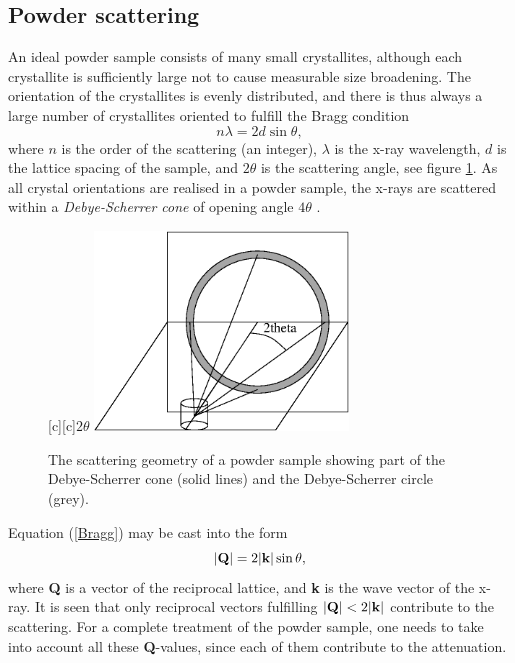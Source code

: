 \subsection{Powder scattering}
An ideal powder sample consists of many small
crystallites, although each crystallite is sufficiently
large not to cause measurable size broadening.
The orientation of the crystallites is evenly distributed,
and there is thus always a large number of
crystallites oriented to fulfill the Bragg condition
\begin{equation}   \label{Bragg}
n \lambda = 2 d \sin \theta ,
\end{equation}
where $n$ is the order of the scattering (an integer), $\lambda$
is the x-ray wavelength, $d$ is the lattice spacing of the sample,
and $2 \theta$ is the scattering angle, see figure \ref{coneFig}.
As all crystal orientations
are realised in a powder sample, the x-rays are scattered within a
{\em Debye-Scherrer cone} of opening angle $4 \theta$ \cite{bacon}.

\begin{figure}
  \begin{center}
    [c][c]{$2\theta$}
    \includegraphics[width=0.6\textwidth]{figures/powder.eps}
  \end{center}
\caption{The scattering geometry of a powder sample showing part of the
Debye-Scherrer cone (solid lines) and the Debye-Scherrer circle (grey).}
\label{coneFig}
\end{figure}

Equation (\ref{Bragg}) may be cast into the form
\begin{equation}
|{\bf Q}| = 2 |{\bf k}| \sin \theta ,
\end{equation}
where {\bf Q} is a vector of the reciprocal lattice, and {\bf k} is
the wave vector of the x-ray. It is seen that only
reciprocal vectors fulfilling $|{\bf Q}| < 2 |{\bf k}|$
contribute to the scattering.
For a complete treatment of the powder sample, one needs to take
into account all these {\bf Q}-values, since each of them contribute
to the attenuation.

